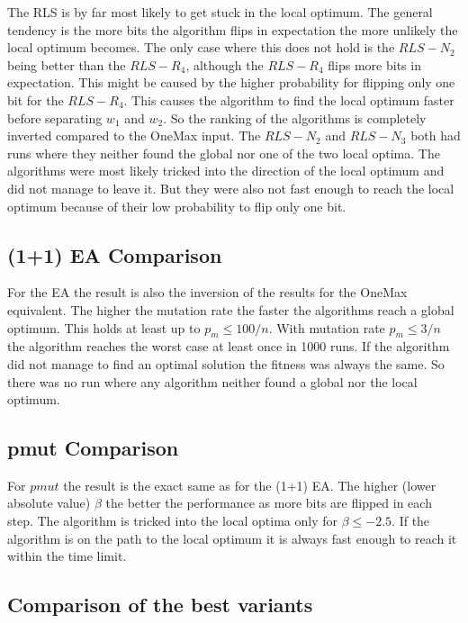 

The RLS is by far most likely to get stuck in the local optimum.
The general tendency is the more bits the algorithm flips in expectation the more unlikely the local optimum becomes.
The only case where this does not hold is the $RLS-N_2$ being better than the $RLS-R_4$, although the $RLS-R_4$ flips more bits in expectation.
This might be caused by the higher probability for flipping only one bit for the $RLS-R_4$.
This causes the algorithm to find the local optimum faster before separating $w_1$ and $w_2$.
So the ranking of the algorithms is completely inverted compared to the OneMax input.
The $RLS-N_2$ and $RLS-N_3$ both had runs where they neither found the global nor one of the two local optima.
The algorithms were most likely tricked into the direction of the local optimum and did not manage to leave it.
But they were also not fast enough to reach the local optimum because of their low probability to flip only one bit.
\subsection{(1+1) EA Comparison}




For the EA the result is also the inversion of the results for the OneMax equivalent.
The higher the mutation rate the faster the algorithms reach a global optimum.
This holds at least up to $p_m\le100/n$.
With mutation rate $p_m\le3/n$ the algorithm reaches the worst case at least once in 1000 runs.
If the algorithm did not manage to find an optimal solution the fitness was always the same.
So there was no run where any algorithm neither found a global nor the local optimum.
\subsection{pmut Comparison}




For $pmut$ the result is the exact same as for the (1+1) EA.
The higher (lower absolute value) $\beta$ the better the performance as more bits are flipped in each step.
The algorithm is tricked into the local optima only for $\beta\le-2.5$.
If the algorithm is on the path to the local optimum it is always fast enough to reach it within the time limit.
\subsection{Comparison of the best variants}


